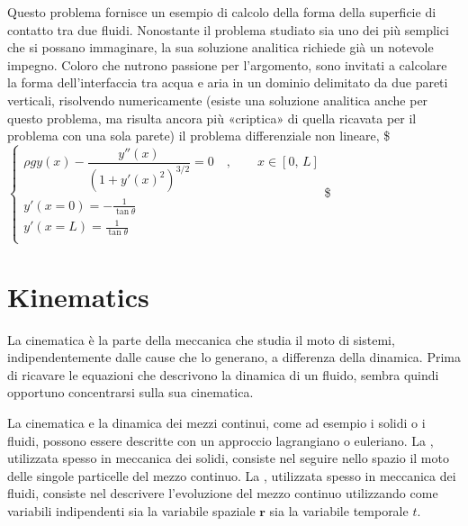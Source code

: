\documentclass[letterpaper,10pt,italian]{jupyterBook}
\begin{document}
\sphinxAtStartPar
{} Questo problema fornisce un esempio di calcolo della
forma della superficie di contatto tra due fluidi. Nonostante il
problema studiato sia uno dei più semplici che si possano immaginare, la
sua soluzione analitica richiede già un notevole impegno. Coloro che
nutrono passione per l’argomento, sono invitati a calcolare la forma
dell’interfaccia tra acqua e aria in un dominio delimitato da due pareti
verticali, risolvendo numericamente (esiste una soluzione analitica
anche per questo problema, ma risulta ancora più «criptica» di quella
ricavata per il problema con una sola parete) il problema differenziale
non lineare, \$\(\begin{cases}
 \rho g y(x) - \dfrac{y''(x)}{\left( 1 + y'(x)^2 \right)^{3/2}} = 0 \quad , \qquad x \in [0,\,L] \\
 y'(x=0) = -\frac{1}{\tan\theta} \\
 y'(x=L) =  \frac{1}{\tan\theta} \\
\end{cases}\)\$

\sphinxstepscope


\chapter{Kinematics}
\label{\detokenize{polimi/fluidmechanics-ita/template/capitoli/03_cinematica/12teoria:kinematics}}\label{\detokenize{polimi/fluidmechanics-ita/template/capitoli/03_cinematica/12teoria:fluid-mechanics-kinematics}}\label{\detokenize{polimi/fluidmechanics-ita/template/capitoli/03_cinematica/12teoria::doc}}
\sphinxAtStartPar
La cinematica è la parte della meccanica che studia il moto di sistemi,
indipendentemente dalle cause che lo generano, a differenza della
dinamica. Prima di ricavare le equazioni che descrivono la dinamica di
un fluido, sembra quindi opportuno concentrarsi sulla sua cinematica.

\sphinxAtStartPar
La cinematica e la dinamica dei mezzi continui, come ad esempio i solidi
o i fluidi, possono essere descritte con un approccio lagrangiano o
euleriano. La , utilizzata spesso in
meccanica dei solidi, consiste nel seguire nello spazio il moto delle
singole particelle del mezzo continuo. La ,
utilizzata spesso in meccanica dei fluidi, consiste nel descrivere
l’evoluzione del mezzo continuo utilizzando come variabili indipendenti
sia la variabile spaziale \(\mathbf{r}\) sia la variabile temporale \(t\).
\end{document}
